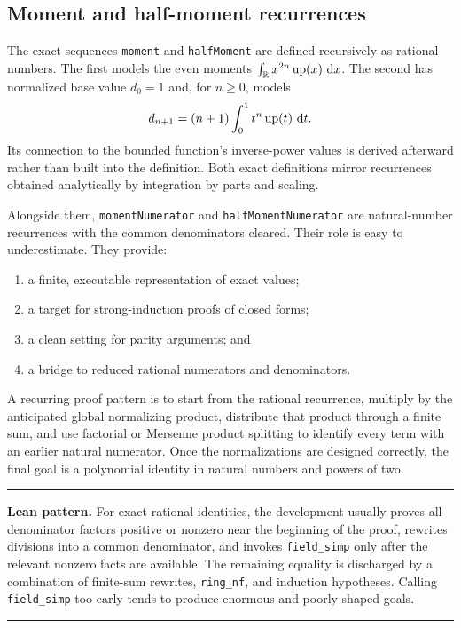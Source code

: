 \documentclass[11pt,oneside]{article}
\theoremstyle{definition}
\theoremstyle{remark}
\newenvironment{boxedremark}{%
  \par\smallskip\noindent\begin{center}\begin{minipage}{0.94\textwidth}%
  \color{black}\hrule\vspace{0.6em}\small
}{%
  \vspace{0.6em}\hrule\end{minipage}\end{center}\smallskip
}
\begin{document}
\subsection{Moment and half-moment recurrences}
The exact sequences \nolinkurl{moment} and \nolinkurl{halfMoment} are defined recursively as rational numbers.  The first models the even moments \(\int_{\mathbb{R}}x^{2n}\operatorname{up}(x)\,\mathop{}\!\mathrm{d} x\).  The second has normalized base value \(d_0=1\) and, for \(n\geq0\), models
\[
  d_{n+1}=(n+1)\int_0^1 t^n\operatorname{up}(t)\,\mathop{}\!\mathrm{d} t.
\]
Its connection to the bounded function's inverse-power values is derived afterward rather than built into the definition.  Both exact definitions mirror recurrences obtained analytically by integration by parts and scaling.

Alongside them, \nolinkurl{momentNumerator} and \nolinkurl{halfMomentNumerator} are natural-number recurrences with the common denominators cleared.  Their role is easy to underestimate.  They provide:
\begin{enumerate}
  \item a finite, executable representation of exact values;
  \item a target for strong-induction proofs of closed forms;
  \item a clean setting for parity arguments; and
  \item a bridge to reduced rational numerators and denominators.
\end{enumerate}

A recurring proof pattern is to start from the rational recurrence, multiply by the anticipated global normalizing product, distribute that product through a finite sum, and use factorial or Mersenne product splitting to identify every term with an earlier natural numerator.  Once the normalizations are designed correctly, the final goal is a polynomial identity in natural numbers and powers of two.

\begin{boxedremark}\textbf{Lean pattern.}\space
For exact rational identities, the development usually proves all denominator factors positive or nonzero near the beginning of the proof, rewrites divisions into a common denominator, and invokes \nolinkurl{field_simp} only after the relevant nonzero facts are available.  The remaining equality is discharged by a combination of finite-sum rewrites, \nolinkurl{ring_nf}, and induction hypotheses.  Calling \nolinkurl{field_simp} too early tends to produce enormous and poorly shaped goals.
\end{boxedremark}
\end{document}
